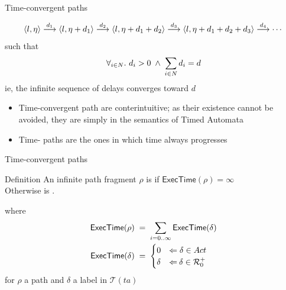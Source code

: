 \documentclass[aspectratio=169]{beamer}
\def\R{\mathcal{R}}
\def\TL#1{\mathcal{T}(#1)}
\def\ET#1{\mathsf{ExecTime(#1)}}
\def\tran#1{\stackrel{#1}{\longrightarrow}}
\begin{document}
\begin{slide}{Time-convergent paths}
\small

\begin{equation*}
\pair{l,\eta}  \tran{d_1} \pair{l,\eta + d_1}  \tran{d_2} \pair{l,\eta + d_1 + d_2}  \tran{d_3} \pair{l,\eta + d_1 + d_2 + d_3}  \tran{d_4} 
\cdots  
\end{equation*}
such that 
\begin{equation*}
\forall_{i \in N}\mathbf{.}\,\, d_i > 0\; \land\; \sum_{i \in N}  d_i = d
\end{equation*}
ie, the \alert{infinite sequence of delays converges toward $d$}

\begin{itemize}
\item Time-convergent path are \alert{conterintuitive}; as their existence cannot be avoided, they are simply   in the semantics of Timed Automata
\item Time- paths are the ones in which time always progresses
\end{itemize}
\end{slide}

\begin{slide}{Time-convergent paths}
\small

\begin{block}{Definition}
An infinite path fragment $\rho$ is  if $\ET{\rho} = \infty$\\
Otherwise is  . 
\end{block}

where
\begin{align*}
\ET{\rho}\; & =\; \sum_{i=0 .. \infty} \ET{\delta}\\
\ET{\delta}\; & =\; \begin{cases}
0 & \rimp\;  \delta \in Act\\
\delta & \rimp\:  \delta \in \R_0^+
\end{cases}
\end{align*}
for $\rho$ a path and $\delta$ a label in $\TL{ta}$ 
\end{slide}
\end{document}
